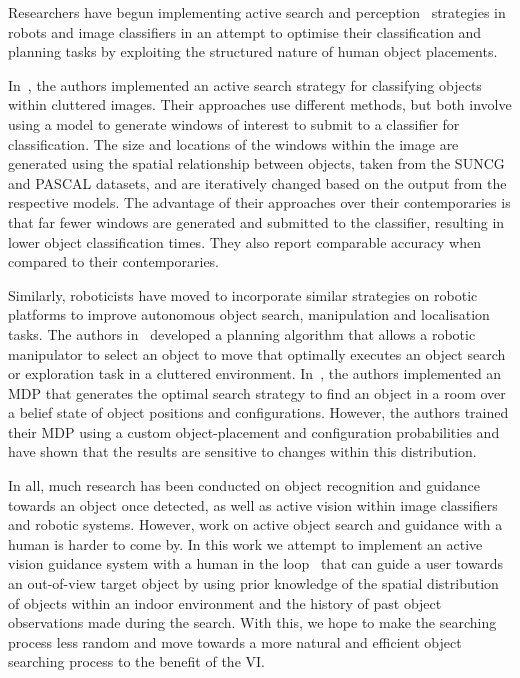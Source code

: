\documentclass[a4paper, twoside]{article}
\begin{document}
Researchers have begun implementing active search and perception~\cite{aloimonos2013active} strategies in robots and image classifiers in an attempt to optimise their classification and planning tasks by exploiting the structured nature of human object placements. 

In~\cite{caicedo2015active,gonzalez2015active}, the authors implemented an active search strategy for classifying objects within cluttered images. Their approaches use different methods, but both involve using a model to generate windows of interest to submit to a classifier for classification. The size and locations of the windows within the image are generated using the spatial relationship between objects, taken from the SUNCG and PASCAL datasets, and are iteratively changed based on the output from the respective models. The advantage of their approaches over their contemporaries is that far fewer windows are generated and submitted to the classifier, resulting in lower object classification times. They also report comparable accuracy when compared to their contemporaries. 

Similarly, roboticists have moved to incorporate similar strategies on robotic platforms to improve autonomous object search, manipulation and localisation tasks. The authors in~\cite{dogar2014object} developed a planning algorithm that allows a robotic manipulator to select an object to move that optimally executes an object search or exploration task in a cluttered environment. In~\cite{aydemir2011search}, the authors implemented an MDP that generates the optimal search strategy to find an object in a room over a belief state of object positions and configurations. However, the authors trained their MDP using a custom object-placement and configuration probabilities and have shown that the results are sensitive to changes within this distribution. 

In all, much research has been conducted on object recognition and guidance towards an object once detected, as well as active vision within image classifiers and robotic systems. However, work on active object search and guidance with a human is harder to come by. In this work we attempt to implement an active vision guidance system with a human in the loop~\cite{bellotto2013,lock2017portable} that can guide a user towards an out-of-view target object by using prior knowledge of the spatial distribution of objects within an indoor environment and the history of past object observations made during the search. With this, we hope to make the searching process less random and move towards a more natural and efficient object searching process to the benefit of the VI\@.  
\end{document}
